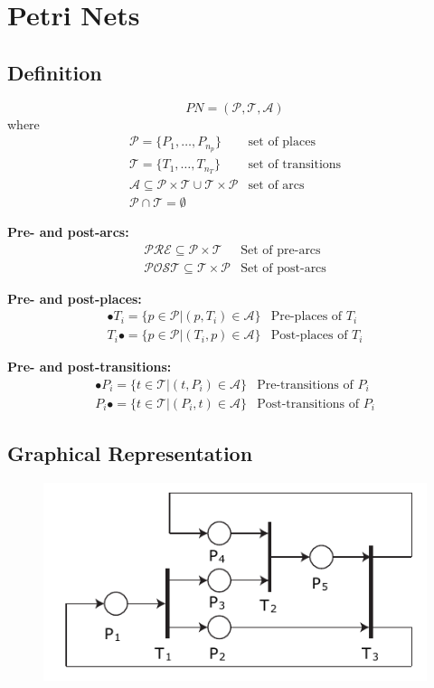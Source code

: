 \documentclass[10pt,a4paper]{article}
\begin{document}
\section{Petri Nets}
\subsection{Definition}
$$
	PN = (\mathcal P, \mathcal T, \mathcal A)
$$ where
$$
	\begin{array}{ll}
		\mathcal P = \{P_1, \dots, P_{n_p}\} & \text{set of places} \\
		\mathcal T = \{T_1, \dots, T_{n_T}\} & \text{set of transitions} \\
		\mathcal A \subseteq \mathcal P \times \mathcal T \cup \mathcal T \times \mathcal P & \text{set of arcs} \\
		\mathcal P \cap \mathcal T = \emptyset
	\end{array}
$$

\textbf{Pre- and post-arcs:} \\
$$
	\begin{array}{ll}
		\mathcal{PRE} \subseteq \mathcal P \times \mathcal T & \text{Set of pre-arcs} \\
		\mathcal{POST} \subseteq \mathcal T \times \mathcal P & \text{Set of post-arcs}
	\end{array}
$$

\textbf{Pre- and post-places:} \\
$$
	\begin{array}{ll}
		\bullet T_i = \{p \in \mathcal P | (p, T_i) \in \mathcal A\} & \text{Pre-places of } T_i \\
		T_i \bullet = \{p \in \mathcal P | (T_i, p) \in \mathcal A\} & \text{Post-places of } T_i
	\end{array}
$$

\textbf{Pre- and post-transitions:} \\
$$
	\begin{array}{ll}
		\bullet P_i = \{t \in \mathcal T | (t, P_i) \in \mathcal A\} & \text{Pre-transitions of } P_i \\
		P_i \bullet = \{t \in \mathcal T | (P_i, t) \in \mathcal A\} & \text{Post-transitions of } P_i
	\end{array}
$$

\subsection{Graphical Representation}
\begin{figure}[H]
	\includegraphics[width=0.7\columnwidth]{figures/petri_net.pdf}
\end{figure}
\end{document}
